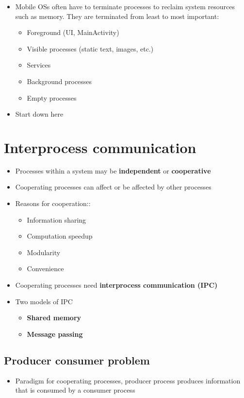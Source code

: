 \documentclass[12pt]{book}
\begin{document}
\begin{itemize}
    \item Mobile OSs often have to terminate processes to reclaim system resources such as memory. They are terminated from least to most important:
    \begin{itemize}
        \item Foreground (UI, MainActivity)
        \item Visible processes (static text, images, etc.)
        \item Services
        \item Background processes
        \item Empty processes
    \end{itemize} 
    \item Start down here
\end{itemize}

\section*{Interprocess communication}

\begin{itemize}
    \item Processes within a system may be \textbf{independent} or \textbf{cooperative}
    \item Cooperating processes can affect or be affected by other processes
    \item Reasons for cooperation::
    \begin{itemize}
        \item Information sharing
        \item Computation speedup
        \item Modularity
        \item Convenience
    \end{itemize} 

    \item Cooperating processes need \textbf{interprocess communication (IPC)}
    \item Two models of IPC
    \begin{itemize}
        \item \textbf{Shared memory}
        \item \textbf{Message passing}
    \end{itemize} 
\end{itemize}

\subsection*{Producer consumer problem}

\begin{itemize}
    \item Paradigm for cooperating processes, producer process produces information that is consumed by a consumer process
\end{itemize}
\end{document}
